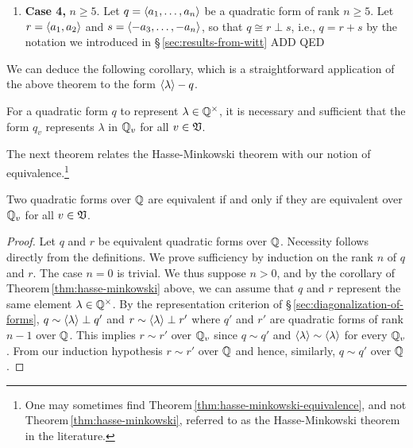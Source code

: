 \begin{enumerate}[wide, nosep, label=(\alph*)]
    \item \textbf{Case 4,} \(n \geq 5\). Let \(q = \langle a_1, \dots, a_n \rangle\) be a quadratic form of rank \(n \geq 5\). Let \(r = \langle a_1, a_2 \rangle\) and \(s = \langle -a_3, \dots, -a_n \rangle\), so that \(q \cong r \perp s\), i.e., \(q = r + s\) by the notation we introduced in \S\,\ref{sec:results-from-witt} 
    ADD QED
\end{enumerate}

\medskip

We can deduce the following corollary, which is a straightforward application of the above theorem to the form \(\langle \lambda \rangle - q\).

\begin{corollary}
    For a quadratic form \(q\) to represent \(\lambda \in \mathbb{Q}^{\times}\), it is necessary and sufficient that the form \(q_v\) represents \(\lambda\) in \(\mathbb{Q}_v\) for all \(v \in \mathfrak{V}\).
\end{corollary}

The next theorem relates the Hasse-Minkowski theorem with our notion of equivalence.\footnote{One may sometimes find Theorem\,\ref{thm:hasse-minkowski-equivalence}, and not Theorem\,\ref{thm:hasse-minkowski}, referred to as the Hasse-Minkowski theorem in the literature.}

\begin{theoremx}\label{thm:hasse-minkowski-equivalence}
    Two quadratic forms over \(\mathbb{Q}\) are equivalent if and only if they are equivalent over \(\mathbb{Q}_v\) for all \(v \in \mathfrak{V}\).
\end{theoremx}

\begin{proof}
    Let \(q\) and \(r\) be equivalent quadratic forms over \(\mathbb{Q}\). Necessity follows directly from the definitions. We prove sufficiency by induction on the rank \(n\) of \(q\) and \(r\). The case \(n = 0\) is trivial. We thus suppose \(n > 0\), and by the corollary of Theorem\,\ref{thm:hasse-minkowski} above, we can assume that \(q\) and \(r\) represent the same element \(\lambda \in \mathbb{Q}^{\times}\). By the representation criterion of \S\,\ref{sec:diagonalization-of-forms}, \(q \sim \langle \lambda \rangle \perp q'\) and \(r \sim \langle \lambda \rangle \perp r'\) where \(q'\) and \(r'\) are quadratic forms of rank \(n - 1\) over \(\mathbb{Q}\). This implies \(r \sim r'\) over \(\mathbb{Q}_v\) since \(q \sim q'\) and \(\langle \lambda \rangle \sim \langle \lambda \rangle\) for every \(\mathbb{Q}_v\). From our induction hypothesis \(r \sim r'\) over \(\mathbb{Q}\) and hence, similarly, \(q \sim q'\) over \(\mathbb{Q}\).
\end{proof}

